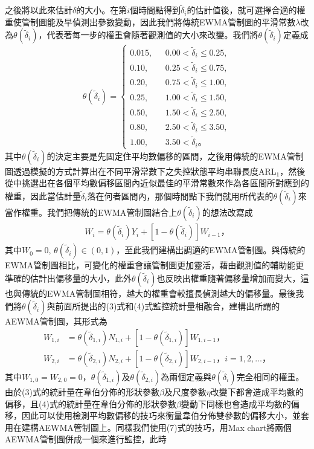 \documentclass[12pt]{article}  %
\theoremstyle{plain}
\begin{document}
之後將以此來估計$\delta$的大小。在第$i$個時間點得到$\tilde{\delta}_i$的估計值後，就可選擇合適的權重使管制圖能及早偵測出參數變動，因此我們將傳統EWMA管制圖的平滑常數$\lambda$改為$\theta(\tilde{\delta}_i)$，代表著每一步的權重會隨著觀測值的大小來改變。我們將$\theta(\tilde{\delta}_i)$定義成
\[\theta(\tilde{\delta}_i) =
\begin{cases}
0.015 ,& \mbox{ $0.00< \tilde{\delta}_i \leq 0.25$}, \\
0.10 ,& \mbox{ $0.25< \tilde{\delta}_i \leq 0.75$},\\
0.20 ,& \mbox{ $0.75< \tilde{\delta}_i \leq 1.00$},\\
0.25 ,& \mbox{ $1.00< \tilde{\delta}_i \leq 1.50$},\\
0.50 ,& \mbox{ $1.50< \tilde{\delta}_i \leq 2.50$},\\
0.80 ,& \mbox{ $2.50< \tilde{\delta}_i \leq 3.50$},\\
1.00 ,& \mbox{ $3.50 < \tilde{\delta}_i $} 
\mbox{。}\end{cases}\]
其中$\theta(\tilde{\delta}_i)$的決定主要是先固定住平均數偏移的區間，之後用傳統的EWMA管制圖透過模擬的方式計算出在不同平滑常數下之失控狀態平均串聯長度ARL$_1$，然後從中挑選出在各個平均數偏移區間內近似最佳的平滑常數來作為各區間所對應到的權重，因此當估計量$\tilde{\delta}_i$落在何者區間內，那個時間點下我們就用所代表的$\theta(\tilde{\delta}_i)$來當作權重。我們把傳統的EWMA管制圖結合上$\theta(\tilde{\delta}_i)$的想法改寫成
\begin{align}
W_i = \theta(\tilde{\delta}_i) Y_i + \left[1-\theta(\tilde{\delta}_i)\right] W_{i-1} \mbox{，}
\end{align}
其中$W_0=0$, $\theta(\tilde{\delta}_i) \in (0,1)$，至此我們建構出調適的EWMA管制圖。與傳統的EWMA管制圖相比，可變化的權重會讓管制圖更加靈活，藉由觀測值的輔助能更準確的估計出偏移量的大小，此外$\theta(\tilde{\delta}_i)$也反映出權重隨著偏移量增加而變大，這也與傳統的EWMA管制圖相符，越大的權重會較擅長偵測越大的偏移量。最後我們將$\theta(\tilde{\delta}_i)$與前面所提出的(3)式和(4)式監控統計量相融合，建構出所謂的AEWMA管制圖，其形式為
\begin{align}
W_{1,i}&=\theta(\tilde{\delta}_{1,i}) N_{1,i} + \left[1-\theta(\tilde{\delta}_{1,i})\right] W_{1,i-1} \mbox{，}\\
W_{2,i}&=\theta(\tilde{\delta}_{2,i}) N_{2,i} + \left[1-\theta(\tilde{\delta}_{2,i})\right] W_{2,i-1} \mbox{，}i=1,2,\ldots\mbox{，}
\end{align}
其中$W_{1,0}=W_{2,0}=0$，$\theta(\tilde{\delta}_{1,i})$及$\theta(\tilde{\delta}_{2,i})$為兩個定義與$\theta(\tilde{\delta}_i)$完全相同的權重。由於(3)式的統計量在韋伯分佈的形狀參數$\beta$及尺度參數$\eta$改變下都會造成平均數的偏移，且(4)式的統計量在韋伯分佈的形狀參數$\beta$變動下同樣也會造成平均數的偏移，因此可以使用檢測平均數偏移的技巧來衡量韋伯分佈雙參數的偏移大小，並套用在建構AEWMA管制圖上。同樣我們使用(7)式的技巧，用Max chart將兩個AEWMA管制圖併成一個來進行監控，此時
\end{document}
